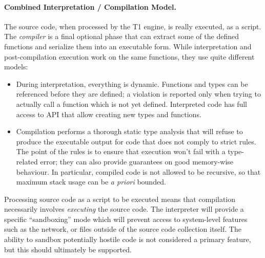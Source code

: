 \paragraph{Combined Interpretation / Compilation Model.} The source
code, when processed by the T1 engine, is really executed, as a script.
The \emph{compiler} is a final optional phase that can extract some of
the defined functions and serialize them into an executable form. While
interpretation and post-compilation execution work on the same
functions, they use quite different models:
\begin{itemize}

    \item During interpretation, everything is dynamic. Functions and
    types can be referenced before they are defined; a violation is
    reported only when trying to actually call a function which is not
    yet defined. Interpreted code has full access to API that allow
    creating new types and functions.

    \item Compilation performs a thorough static type analysis that will
    refuse to produce the executable output for code that does not
    comply to strict rules. The point of the rules is to ensure that
    execution won't fail with a type-related error; they can also
    provide guarantees on good memory-wise behaviour. In particular,
    compiled code is not allowed to be recursive, so that maximum stack
    usage can be \emph{a priori} bounded.

\end{itemize}

Processing source code as a script to be executed means that compilation
necessarily involves \emph{executing} the source code. The interpreter
will provide a specific ``sandboxing'' mode which will prevent access to
system-level features such as the network, or files outside of the
source code collection itself. The ability to sandbox potentially
hostile code is not considered a primary feature, but this should
ultimately be supported.

